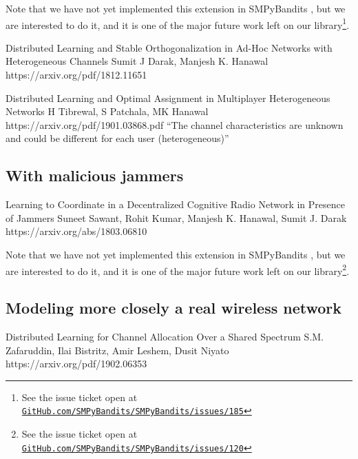 Note that we have not yet implemented this extension in SMPyBandits \cite{SMPyBandits}, but we are interested to do it, and it is one of the major future work left on our library\footnote{See the issue ticket open at \href{https://github.com/SMPyBandits/SMPyBandits/issues/185}{\texttt{GitHub.com/SMPyBandits/SMPyBandits/issues/185}}}.


Distributed Learning and Stable Orthogonalization in Ad-Hoc Networks with Heterogeneous Channels
Sumit J Darak, Manjesh K. Hanawal
https://arxiv.org/pdf/1812.11651
\cite{DarakHanawal18}


Distributed Learning and Optimal Assignment in Multiplayer Heterogeneous Networks
H Tibrewal, S Patchala, MK Hanawal
https://arxiv.org/pdf/1901.03868.pdf
\cite{Tibrewal2019}
``The channel characteristics are unknown  and  could  be  different  for  each  user  (heterogeneous)''


\subsection{With malicious jammers}
\label{sub:5:withDifferentMeansAmongPlayers}


Learning to Coordinate in a Decentralized Cognitive Radio Network in Presence of Jammers
Suneet Sawant, Rohit Kumar, Manjesh K. Hanawal, Sumit J. Darak
https://arxiv.org/abs/1803.06810
\cite{SawantKumar2018}



Note that we have not yet implemented this extension in SMPyBandits \cite{SMPyBandits}, but we are interested to do it, and it is one of the major future work left on our library\footnote{See the issue ticket open at \href{https://github.com/SMPyBandits/SMPyBandits/issues/120}{\texttt{GitHub.com/SMPyBandits/SMPyBandits/issues/120}}}.


\subsection{Modeling more closely a real wireless network}
\label{sub:5:moreRealisticModels}

\cite{NaparstekCohen17}

Distributed Learning for Channel Allocation Over a Shared Spectrum
S.M. Zafaruddin, Ilai Bistritz, Amir Leshem, Dusit Niyato
https://arxiv.org/pdf/1902.06353
\cite{Zafaruddin2019}


